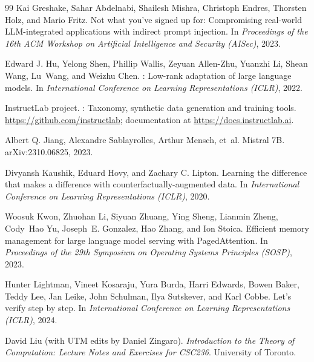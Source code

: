 \documentclass[11pt,a4paper]{article}
\newif\ifdraft
\newcommand{\todo}[2]{%
  \ifdraft\textcolor{red}{\textbf{[TODO #1:} #2\textbf{]}}\fi}
\theoremstyle{definition}
\begin{document}
\begin{thebibliography}{99}
Kai Greshake, Sahar Abdelnabi, Shailesh Mishra, Christoph Endres, Thorsten Holz, and Mario Fritz.
\newblock Not what you've signed up for: Compromising real-world {LLM}-integrated applications with indirect prompt injection.
\newblock In \emph{Proceedings of the 16th ACM Workshop on Artificial Intelligence and Security (AISec)}, 2023.

Edward J. Hu, Yelong Shen, Phillip Wallis, Zeyuan Allen-Zhu, Yuanzhi Li, Shean Wang, Lu~Wang, and Weizhu Chen.
: Low-rank adaptation of large language models.
\newblock In \emph{International Conference on Learning Representations (ICLR)}, 2022.

InstructLab project.
: Taxonomy, synthetic data generation and training tools.
\newblock \url{https://github.com/instructlab}; documentation at \url{https://docs.instructlab.ai}.

Albert Q. Jiang, Alexandre Sablayrolles, Arthur Mensch, et~al.
\newblock Mistral {7B}.
\newblock arXiv:2310.06825, 2023.

Divyansh Kaushik, Eduard Hovy, and Zachary C. Lipton.
\newblock Learning the difference that makes a difference with counterfactually-augmented data.
\newblock In \emph{International Conference on Learning Representations (ICLR)}, 2020.

Woosuk Kwon, Zhuohan Li, Siyuan Zhuang, Ying Sheng, Lianmin Zheng, Cody~Hao Yu, Joseph~E. Gonzalez, Hao Zhang, and Ion Stoica.
\newblock Efficient memory management for large language model serving with {PagedAttention}.
\newblock In \emph{Proceedings of the 29th Symposium on Operating Systems Principles (SOSP)}, 2023.

Hunter Lightman, Vineet Kosaraju, Yura Burda, Harri Edwards, Bowen Baker, Teddy Lee, Jan Leike, John Schulman, Ilya Sutskever, and Karl Cobbe.
\newblock Let's verify step by step.
\newblock In \emph{International Conference on Learning Representations (ICLR)}, 2024.

David Liu (with UTM edits by Daniel Zingaro).
\newblock \emph{Introduction to the Theory of Computation: Lecture Notes and Exercises for CSC236}.
\newblock University of Toronto. \todo{}{year/edition and link}


\end{thebibliography}
\end{document}
